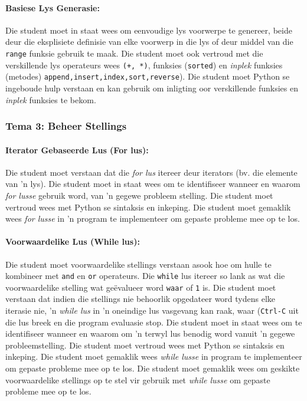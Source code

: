 	  \paragraph{Basiese Lys Generasie:}
                  Die student moet in staat wees om eenvoudige lys voorwerpe te genereer, 
             beide deur die eksplisiete definisie van elke voorwerp in die lys of deur middel van 
	   die \texttt{range} funksie gebruik te maak. Die student 
             moet ook vertroud met die verskillende lys operateurs wees 
             \texttt {(+, *)}, funksies (\texttt {sorted}) en \textit{inplek}
             funksies (metodes) 
             \texttt {append,insert,index,sort,reverse}). Die student 
             moet Python se ingeboude hulp verstaan en kan gebruik
		 om inligting oor verskillende funksies en 
             \textit{inplek} funksies te bekom.

                
        \subsubsection{Tema 3: Beheer Stellings}
            \paragraph{Iterator Gebaseerde Lus (For lus):}
		Die student moet verstaan ​​dat die \textit{for lus} 
             itereer deur iterators (bv. die elemente van 'n 
             lys). Die student moet in staat wees om te identifiseer wanneer en waarom
             \textit{for lusse} gebruik  word, van 'n gegewe probleem 
             stelling. Die student moet vertroud wees met Python se  
             sintaksis en inkeping. Die student moet gemaklik wees 
             \textit {for lusse} in 'n program te implementeer om gepaste probleme mee op te los.

	     \paragraph{Voorwaardelike Lus (While lus):}
		Die student moet voorwaardelike stellings verstaan asook hoe
             om hulle te kombineer met \texttt {and} en \texttt{or} 
             operateurs. Die \texttt{while} lus itereer so lank as wat die voorwaardelike stelling
    	    wat ge\"evalueer word \texttt{waar} of \texttt{1} is. Die 
             student moet verstaan ​​dat indien die stellings nie 
             behoorlik opgedateer word tydens elke iterasie nie, 'n \textit {while lus} in 'n oneindige lus
             vasgevang kan raak, waar (\texttt {Ctrl-C} uit die lus breek en die program evaluasie stop. Die 	  	
	    student moet in staat wees om te 
             identifiseer wanneer en waarom om 'n terwyl lus benodig word vanuit 'n gegewe 
             probleemstelling. Die student moet vertroud wees met Python se  
             sintaksis en inkeping. Die student moet gemaklik wees 
             \textit {while lusse} in program te implementeer om gepaste probleme mee op te los.
 	    Die student moet gemaklik wees om geskikte voorwaardelike stellings op te stel vir gebruik met
	    \textit{while lusse} om gepaste probleme mee op te los.
		
